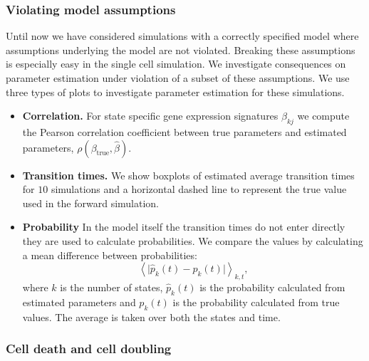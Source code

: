 \subsubsection{Violating model assumptions}
\label{sec:viol-model-assumpt}

Until now we have considered simulations with a correctly specified model where assumptions underlying the model are not violated. Breaking these assumptions is especially easy in the single cell simulation. We investigate consequences on parameter estimation under violation of a subset of these assumptions. We use three types of plots to investigate parameter estimation for these simulations. 

\begin{itemize}
\item {\bf Correlation.} For state specific gene expression signatures $\beta_{kj}$ we compute the Pearson correlation coefficient between true parameters and estimated parameters, $\rho(\beta_{\mathrm{true}},\hat{\beta})$.
\item {\bf Transition times.} We show boxplots of estimated average transition times for $10$ simulations and a horizontal dashed line to represent the true value used in the forward simulation.
\item {\bf Probability} In the model itself the transition times do not enter directly they are used to calculate probabilities. We compare the values by calculating a mean difference between probabilities:
\begin{equation}
  \label{eq:1}
  \left< \lvert \hat{p}_k(t) - p_k(t) \rvert \right>_{k,t}, 
\end{equation}
where $k$ is the number of states, $\hat{p}_k(t)$ is the probability calculated from estimated parameters and $p_k(t)$ is
the probability calculated from true values. The average is taken over both the states and time. 
\end{itemize}



\subsubsection{Cell death and cell doubling}
\label{sec:death-duplication}

